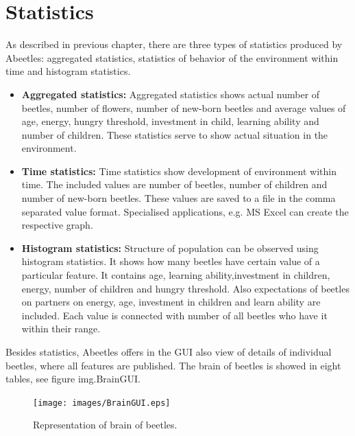 \documentclass[a4paper,12pt]{report}
\begin{document}
\section {Statistics}
As described in previous chapter, there are three types of statistics produced by Abeetles: aggregated statistics, statistics of behavior of the environment within time and histogram statistics.
\begin{itemize}
\item \textbf{Aggregated statistics: }
Aggregated statistics shows actual number of beetles, number of flowers, number of new-born beetles and average values of age, energy, hungry threshold, investment in child, learning ability and number of children. These statistics serve to show actual situation in the environment.
\item \textbf{Time statistics: }
Time statistics show development of environment within time. The included values are number of beetles, number of children and number of new-born beetles.
These values are saved to a file in the comma separated value format. Specialised applications, e.g. MS Excel can create the respective graph. 
\item \textbf{Histogram statistics: }
Structure of population can be observed using histogram statistics. It shows how many beetles have certain value of a particular feature. It contains age, learning ability,investment in children, energy, number of children and hungry threshold. Also expectations of beetles on partners on energy, age, investment in children and learn ability are included. Each value is connected with number of all beetles who have it within their range. 
\end{itemize}

Besides statistics, Abeetles offers in the GUI also view of details of individual beetles, where all features are published. The brain of beetles is showed in eight tables, see figure {img.BrainGUI}.

\begin{figure}
\begin{center}
  \texttt{[image: images/BrainGUI.eps]}
  \caption{Representation of brain of beetles.}
  \label{img.BrainGUI}
\end{center}
\end{figure}
\end{document}
